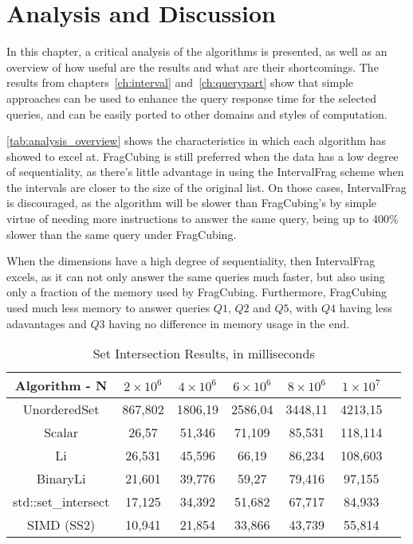 
\chapter{Analysis and Discussion}\label{ch:analysis}

In this chapter, a critical analysis of the algorithms is presented, as well as an overview of how useful are the results and what are their shortcomings.
The results from chapters~\ref{ch:interval} and~\ref{ch:querypart} show that simple approaches can be used to enhance the query response time for the selected queries, and can be easily ported to other domains and styles of computation.

\autoref{tab:analysis_overview} shows the characteristics in which each algorithm has showed to excel at.
FragCubing is still preferred when the data has a low degree of sequentiality, as there's little advantage in using the IntervalFrag scheme when the intervals are closer to the size of the original list.
On those cases, IntervalFrag is discouraged, as the algorithm will be slower than FragCubing's by simple virtue of needing more instructions to answer the same query, being up to 400\% slower than the same query under FragCubing.

When the dimensions have a high degree of sequentiality, then IntervalFrag excels, as it can not only answer the same queries much faster, but also using only a fraction of the memory used by FragCubing.
Furthermore, FragCubing used much less memory to answer queries $Q1$, $Q2$ and $Q5$, with $Q4$ having less adavantages and $Q3$ having no difference in memory usage in the end.

\begin{table}[!ht]
  \begin{center}
    \caption{Set Intersection Results, in milliseconds}\label{tab:setresults}
    \begin{tabular}{|c|c|c|c|c|c|c|}
      \hline
      \textbf{Algorithm - N} & \bfseries $2\times10^6$ & \bfseries $4\times10^6$ & \bfseries $6\times10^6$ & \bfseries $8\times10^6$ & \bfseries $1\times10^7$\\
      \hline
      UnorderedSet & 867,802 & 1806,19 & 2586,04 & 3448,11 & 4213,15\\
      \hline
      Scalar & 26,57 & 51,346 & 71,109 & 85,531 & 118,114\\
      \hline
      Li & 26,531 & 45,596 & 66,19 & 86,234 & 108,603\\
      \hline
      BinaryLi & 21,601 & 39,776 & 59,27 & 79,416 & 97,155\\
      \hline
      std::set\_intersect & 17,125 & 34,392 & 51,682 & 67,717 & 84,933\\
      \hline
      SIMD (SS2) & 10,941 & 21,854 & 33,866 & 43,739 & 55,814\\
      \hline
    \end{tabular}
  \end{center}
\end{table}

